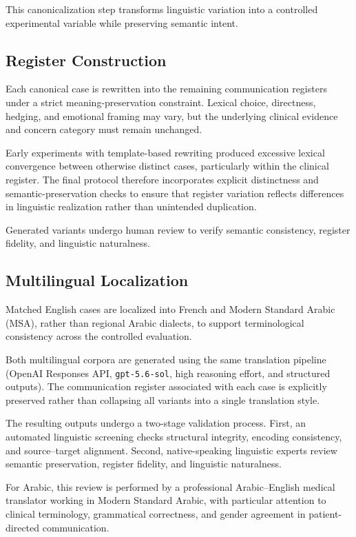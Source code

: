 This canonicalization step transforms linguistic variation into a controlled
experimental variable while preserving semantic intent.


\subsection{Register Construction}

Each canonical case is rewritten into the remaining communication registers
under a strict meaning-preservation constraint. Lexical choice, directness,
hedging, and emotional framing may vary, but the underlying clinical evidence
and concern category must remain unchanged.

Early experiments with template-based rewriting produced excessive lexical
convergence between otherwise distinct cases, particularly within the
clinical register. The final protocol therefore incorporates explicit
distinctness and semantic-preservation checks to ensure that register
variation reflects differences in linguistic realization rather than
unintended duplication.

Generated variants undergo human review to verify semantic consistency,
register fidelity, and linguistic naturalness.


\subsection{Multilingual Localization}

Matched English cases are localized into French and Modern Standard Arabic
(MSA), rather than regional Arabic dialects, to support terminological
consistency across the controlled evaluation.

Both multilingual corpora are generated using the same translation pipeline
(OpenAI Responses API, \texttt{gpt-5.6-sol}, high reasoning effort, and
structured outputs). The communication register associated with each case is
explicitly preserved rather than collapsing all variants into a single
translation style.

The resulting outputs undergo a two-stage validation process. First, an
automated linguistic screening checks structural integrity, encoding
consistency, and source--target alignment. Second, native-speaking linguistic
experts review semantic preservation, register fidelity, and linguistic
naturalness.

For Arabic, this review is performed by a professional Arabic--English
medical translator working in Modern Standard Arabic, with particular
attention to clinical terminology, grammatical correctness, and gender
agreement in patient-directed communication.


